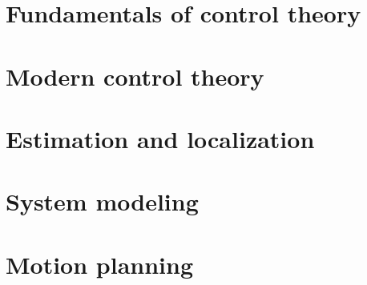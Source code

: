 \documentclass[11pt]{book}
\begin{document}
\frontmatter






\newcommand*{\partpath}{}
\newcommand*{\chapterpath}{}

\mainmatter
\setcounter{chapter}{-1}

\renewcommand*{\partpath}{introduction}


\part{Fundamentals of control theory}
\label{part:fundamentals_of_control_theory}
\renewcommand*{\partpath}{fundamentals-of-control-theory}




\part{Modern control theory}
\label{part:modern_control_theory}
\renewcommand*{\partpath}{modern-control-theory}






\part{Estimation and localization}
\label{part:estimation_and_localization}
\renewcommand*{\partpath}{estimation-and-localization}



\part{System modeling}
\label{part:system_modeling}
\renewcommand*{\partpath}{system-modeling}






\part{Motion planning}
\label{part:motion_planning}
\renewcommand*{\partpath}{motion-planning}



\end{document}
